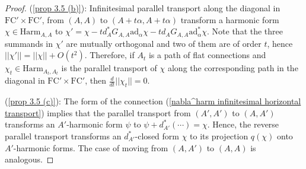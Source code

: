 \documentclass[11pt,a4paper]{amsart}
\theoremstyle{plain} %
\theoremstyle{definition}
\theoremstyle{remark}
\newtheorem{rem}[thm]{Remark}
\newcommand{\g}{\mathfrak{g}}
\newcommand{\mr}{\mathrm}
\newcommand{\bt}{\bullet}
\newcommand{\mc}{\mathcal}
\newcommand{\FC}{\mathrm{FC}}
\begin{document}
{\begin{proof}
(\ref{prop 3.5 (b)}): Infinitesimal parallel transport along the diagonal in $\FC'\times \FC'$, from $(A,A)$ to $(A+t\alpha,A+t\alpha)$ transform a harmonic form $\chi \in \mr{Harm}_{A,A}$ to $\chi'=\chi-t d^*_{A}G_{A,A} \mr{ad}_\alpha \chi -t d_{A} G_{A,A} \mr{ad}^*_{\alpha}\chi$. Note that the three summands in $\chi'$ are mutually orthogonal and two of them are of order $t$, hence $||\chi'||=||\chi||+O(t^2)$. Therefore, if $A_t$ is a path of flat connections and $\chi_t\in \mr{Harm}_{A_t,A_t}$ is the parallel transport of $\chi$ along the corresponding path in the diagonal in $\FC'\times \FC'$, then $\frac{d}{dt}||\chi_t ||=0$.

(\ref{prop 3.5 (c)}): The form of the connection (\ref{nabla^harm infinitesimal horizontal transport}) implies that the parallel transport from $(A',A')$ to $(A,A')$ transforms an $A'$-harmonic form $\psi$ to $\psi+d^*_{A'}(\cdots)=\chi$. Hence, the reverse parallel transport transforms an $d^*_{A'}$-closed form $\chi$ to its projection $q(\chi)$ onto $A'$-harmonic forms. The case of moving from $(A,A')$ to $(A,A)$ is analogous. 
\end{proof}


}
\end{document}
